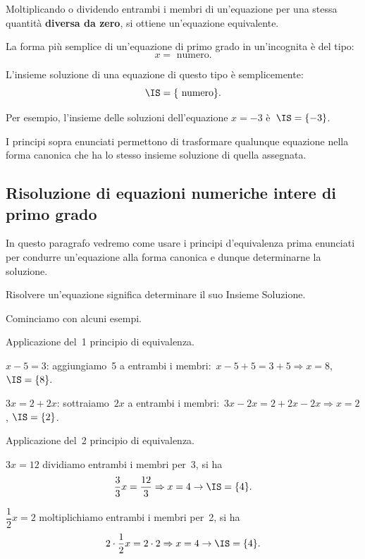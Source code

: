 \begin{principio}
 Moltiplicando o dividendo entrambi i membri di un'equazione 
per una stessa quantità \textbf{diversa da zero}, 
si ottiene un'equazione equivalente.
\end{principio}

La forma più semplice di un'equazione di primo grado in
un'incognita è del tipo:
\[x = \text{ numero}.\]

L'insieme soluzione di una
equazione di questo tipo è semplicemente:
\[\IS=\{\text{ numero} \}.\]

Per esempio, l'insieme delle soluzioni dell'equazione
\(x = -3\) è~\(\IS =\{-3\}\).

I principi sopra enunciati permettono di trasformare qualunque equazione
nella forma canonica che ha lo stesso insieme soluzione di quella
assegnata.

\subsection{Risoluzione di equazioni numeriche intere di primo grado}
In questo paragrafo vedremo come usare i principi
d'equivalenza prima enunciati per condurre
un'equazione alla forma canonica e dunque determinarne
la soluzione.

\begin{definizione}
Risolvere un'equazione significa
determinare il suo Insieme Soluzione.
\end{definizione}

Cominciamo con alcuni esempi.

 \begin{esempio}
Applicazione del~1{\textdegree} principio di equivalenza.

\begin{enumeratea}
\item \(x-5=3\):
aggiungiamo~5 a entrambi i membri:~\(x-5+5=3+5\Rightarrow x=8\), \(\IS 
=\{8\}.\)
\item \(3x=2+2x\): sottraiamo~\(2x\) a entrambi i 
membri:~\(3x-2x=2+2x-2x\Rightarrow 
x=2\),
\(\IS =\{2\}\).
\end{enumeratea}
 \end{esempio}


 \begin{esempio}
 Applicazione del~2{\textdegree} principio di equivalenza.

 \begin{enumeratea}
\item \(3x=12\) dividiamo entrambi i membri per~3, si ha
\[\dfrac{3}{3}x=\dfrac{12}{3}\Rightarrow x=4\to\IS =\{4\}.\]
\item \(\dfrac{1}{2}x=2\) moltiplichiamo entrambi i membri per~2, si ha
\[2\cdot {\dfrac{1}{2}}x=2\cdot 2\Rightarrow x=4\to\IS =\{4\}.\]
\end{enumeratea}
\end{esempio}

